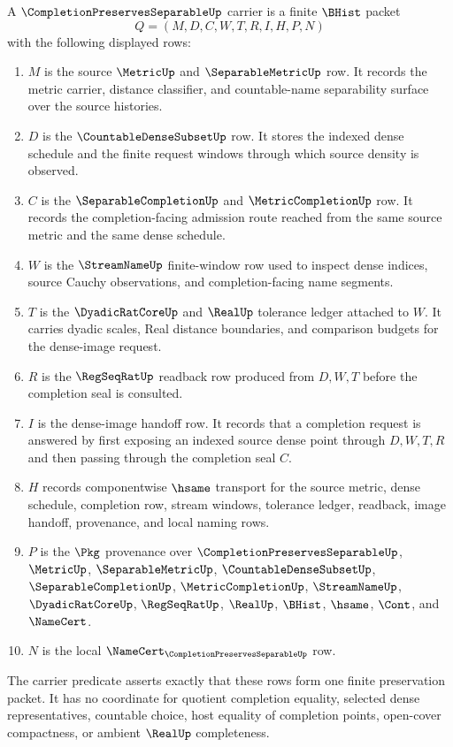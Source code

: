 \begin{definition}\label{def:completion-preserves-separable-carrier}
A $\CompletionPreservesSeparableUp$ carrier is a finite $\BHist$ packet
$$
Q=(M,D,C,W,T,R,I,H,P,N)
$$
with the following displayed rows:
\begin{enumerate}
\item $M$ is the source $\MetricUp$ and $\SeparableMetricUp$ row. It records the metric carrier, distance classifier, and countable-name separability surface over the source histories.
\item $D$ is the $\CountableDenseSubsetUp$ row. It stores the indexed dense schedule and the finite request windows through which source density is observed.
\item $C$ is the $\SeparableCompletionUp$ and $\MetricCompletionUp$ row. It records the completion-facing admission route reached from the same source metric and the same dense schedule.
\item $W$ is the $\StreamNameUp$ finite-window row used to inspect dense indices, source Cauchy observations, and completion-facing name segments.
\item $T$ is the $\DyadicRatCoreUp$ and $\RealUp$ tolerance ledger attached to $W$. It carries dyadic scales, Real distance boundaries, and comparison budgets for the dense-image request.
\item $R$ is the $\RegSeqRatUp$ readback row produced from $D,W,T$ before the completion seal is consulted.
\item $I$ is the dense-image handoff row. It records that a completion request is answered by first exposing an indexed source dense point through $D,W,T,R$ and then passing through the completion seal $C$.
\item $H$ records componentwise $\hsame$ transport for the source metric, dense schedule, completion row, stream windows, tolerance ledger, readback, image handoff, provenance, and local naming rows.
\item $P$ is the $\Pkg$ provenance over $\CompletionPreservesSeparableUp$, $\MetricUp$, $\SeparableMetricUp$, $\CountableDenseSubsetUp$, $\SeparableCompletionUp$, $\MetricCompletionUp$, $\StreamNameUp$, $\DyadicRatCoreUp$, $\RegSeqRatUp$, $\RealUp$, $\BHist$, $\hsame$, $\Cont$, and $\NameCert$.
\item $N$ is the local $\NameCert_{\CompletionPreservesSeparableUp}$ row.
\end{enumerate}
The carrier predicate asserts exactly that these rows form one finite preservation packet. It has no coordinate for quotient completion equality, selected dense representatives, countable choice, host equality of completion points, open-cover compactness, or ambient $\RealUp$ completeness.
\end{definition}

